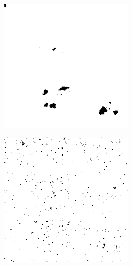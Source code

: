 \begin{figure}[H]
\begin{minipage}[t]{0.245\textwidth}
    \label{fig:noise_5_6}
    \includegraphics[width = \textwidth]{result/noisy/1_5_0.png}
    \label{fig:noise_5_0}
\end{minipage}
\begin{minipage}[t]{0.245\textwidth}
    \includegraphics[width = \textwidth]{result/noisy/1_15_20.png}

\end{minipage}
\end{figure}
